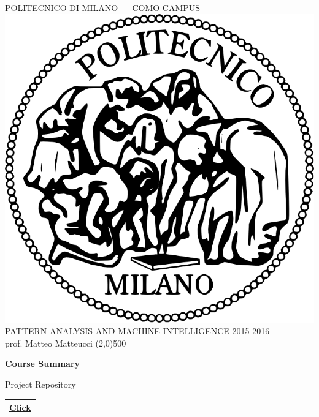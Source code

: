 \documentclass[a4paper,12pt,titlepage]{article} %
\begin{document}
	\begin{titlepage}
		
		\begin{center}
			POLITECNICO DI MILANO --- COMO CAMPUS\\
			\vspace{10pt}
			\includegraphics[scale=0.1]{logo-polimi.png}\\
			\vspace{10pt}
			PATTERN ANALYSIS AND MACHINE INTELLIGENCE 2015-2016\\
			prof. Matteo Matteucci	
			\line(2,0){500}
		\end{center}
		
		\vspace{60pt}	
		\begin{center}
			{\Huge \textbf{Course Summary}}\\
		\end{center}
		
		\vspace{60pt}
		
		\begin{center}
			{\large Project Repository}
		\end{center}
		\begin{tabularx}{\textwidth}{|X|}
			\hline
			\href{https://github.com/attillax/PAMI-2015}{Click}\\
			\hline
		\end{tabularx}
		

\end{titlepage}
\end{document}
